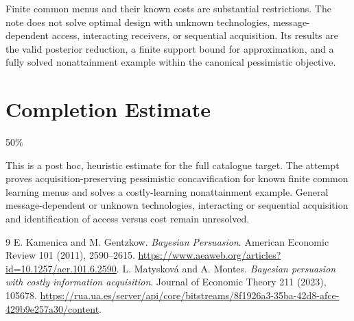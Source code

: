 \documentclass[11pt]{article}
\theoremstyle{definition}
\begin{document}
Finite common menus and their known costs are substantial restrictions.
The note does not solve optimal design with unknown technologies,
message-dependent access, interacting receivers, or sequential acquisition.
Its results are the valid posterior reduction, a finite support bound for
approximation, and a fully solved nonattainment example within the
canonical pessimistic objective.

\section{Completion Estimate}
50\%

This is a post hoc, heuristic estimate for the full catalogue target.
The attempt proves acquisition-preserving pessimistic concavification for known finite common learning menus and solves a costly-learning nonattainment example. General message-dependent or unknown technologies, interacting or sequential acquisition and identification of access versus cost remain unresolved.

\begin{thebibliography}{9}
 E. Kamenica and M. Gentzkow.
\emph{Bayesian Persuasion}. American Economic Review 101 (2011), 2590--2615.
\url{https://www.aeaweb.org/articles?id=10.1257/aer.101.6.2590}.
 L. Matyskov\'a and A. Montes.
\emph{Bayesian persuasion with costly information acquisition}.
Journal of Economic Theory 211 (2023), 105678.
\url{https://rua.ua.es/server/api/core/bitstreams/8f1926a3-35ba-42d8-afce-429b9e257a30/content}.
\end{thebibliography}
\end{document}
